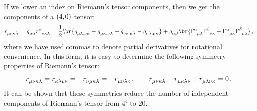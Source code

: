  If we lower an index on Riemann's tensor components, then we get the components of a $\torder 40$ tensor:
%
\begin{equation}\label{eq:lowerindicesinriemanntensor}
  \tensor{\riemann}{_\mu_\nu_\kappa_\lambda} = \tmetric\mu\alpha\triemann\alpha\nu\kappa\lambda
    = \dfrac 12
      \br{
        \tensor{\metric}{_\mu_\lambda_,_\nu_\kappa} - \tensor{\metric}{_\mu_\kappa_,_\nu_\lambda}
        + \tensor{\metric}{_\nu_\kappa_,_\mu_\lambda} - \tensor{\metric}{_\nu_\lambda_,_\mu_\kappa}
      }
      + \tmetric\alpha\beta
      \br{
        \tchris\alpha\mu\lambda \tchris\beta\nu\kappa - \tchris\alpha\mu\kappa \tchris\beta\nu\lambda
      }\,,
\end{equation}
%
where we have used commas to denote partial derivatives for notational convenience. In this form, it is easy to determine the following symmetry properties of Riemann's tensor:
%
\begin{equation}\label{eq:riemanntensorsymmetryproperties}
  \tensor{\riemann}{_\mu_\nu_\kappa_\lambda} 
    = \tensor{\riemann}{_\kappa_\lambda_\mu_\nu}
    = -\tensor{\riemann}{_\nu_\mu_\kappa_\lambda}
    = -\tensor{\riemann}{_\mu_\nu_\lambda_\kappa}\,,
  \qquad
  \tensor{\riemann}{_\mu_\nu_\kappa_\lambda}
  + \tensor{\riemann}{_\mu_\kappa_\lambda_\nu}
  + \tensor{\riemann}{_\mu_\lambda_\nu_\kappa}
  = 0\,.
\end{equation}
%
It can be shown that these symmetries reduce the number of independent components of Riemann's tensor from $4^4$ to $20$.


